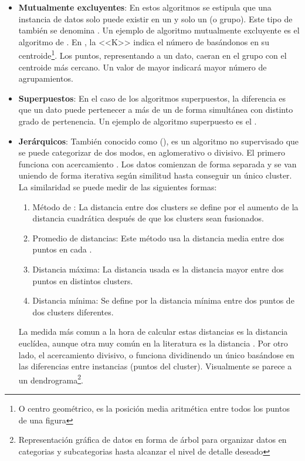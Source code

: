\begin{itemize}
  \item \textbf{Mutualmente excluyentes}: En estos algoritmos se estipula que una instancia de datos solo puede existir en un y solo un  (o grupo). Este tipo de  también se denomina . Un ejemplo de algoritmo mutualmente excluyente es el algoritmo de . En , la <<K>> indica el número de   basándonos en su centroide\footnote{O centro geométrico, es la posición media aritmética entre todos los puntos de una figura}. Los puntos, representando a un dato, caeran en el grupo con el centroide más cercano. Un valor de  mayor indicará mayor número de agrupamientos. 

  \item \textbf{Superpuestos}: En el caso de los algoritmos superpuestos, la diferencia es que un dato puede pertenecer a más de un  de forma simultánea con distinto grado de pertenencia. Un ejemplo de algoritmo superpuesto es el .

  \item \textbf{Jerárquicos}: También conocido como  (), es un algoritmo no supervisado que se puede categorizar de dos modos, en aglomerativo o divisivo. El primero funciona con acercamiento . Los datos comienzan de forma separada y se van uniendo de forma iterativa según similitud hasta conseguir un único cluster. La similaridad se puede medir de las siguientes formas:
        \begin{enumerate}
          \item Método de : La distancia entre dos clusters se define por el aumento de la distancia cuadrática después de que los clusters sean fusionados.
          \item Promedio de distancias: Este método usa la distancia media entre dos puntos en cada .
          \item Distancia máxima: La distancia usada es la distancia mayor entre dos puntos en distintos clusters.
          \item Distancia mínima: Se define por la distancia mínima entre dos puntos de dos clusters diferentes.
        \end{enumerate}
        La medida más comun a la hora de calcular estas distancias es la distancia euclídea, aunque otra muy común en la literatura es la distancia .
        Por otro lado, el acercamiento divisivo, o  funciona dividinendo un único  basándose en las diferencias entre instancias (puntos del cluster). Visualmente se parece a un dendrograma\footnote{Representación gráfica de datos en forma de árbol para organizar datos en categorias y subcategorias hasta alcanzar el nivel de detalle deseado}.


\end{itemize}
